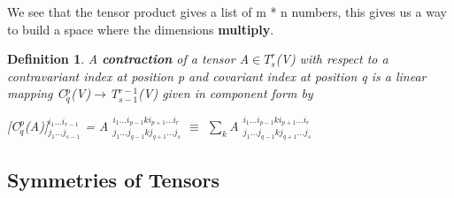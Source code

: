 \documentclass[12pt,a4paper]{article}
\newtheorem{defn}[thm]{Definition}
\begin{document}
We see that the tensor product gives a list of m * n numbers, this gives us a way to build a space where the dimensions \textbf{multiply}.
\begin{defn}
A \textbf{contraction} of a tensor A$\in T^r_s$(V) with respect to a contravariant index at position p and covariant index at position q is a linear mapping C$^p_q$(V)$\to$T$^{r-1}_{s-1}$(V) given in \textit{component form} by\begin{center}
	[C$^p_q$(A)]$^{i_1...i_{r-1}}_{j_1...j_{s-1}}$ = A $^{i_1...i_{p-1}ki_{p+1}...i_r}_{j_1...j_{q-1}kj_{q+1}...j_s}$ $\equiv$ $\sum_{k}$A $^{i_1...i_{p-1}ki_{p+1}...i_r}_{j_1...j_{q-1}kj_{q+1}...j_s}$
\end{center}
\end{defn}
\subsection{Symmetries of Tensors}
\end{document}
